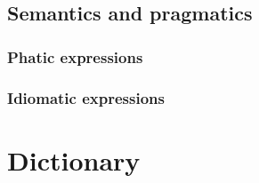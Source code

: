 \documentclass[a4paper,10pt,twoside,openright,draft]{memoir}
\begin{document}
\chapter{Semantics and pragmatics}
\section{Phatic expressions}
\section{Idiomatic expressions}

\part{Dictionary}
\end{document}
